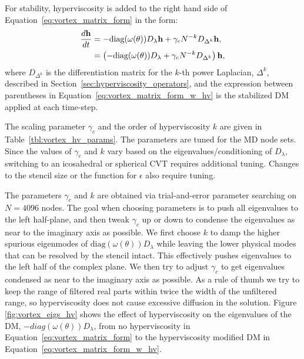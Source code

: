 \documentclass{report}
\begin{document}
For stability, hyperviscosity is added to the right hand side of Equation~\ref{eq:vortex_matrix_form} in the form: 
\begin{align}
\frac{d \mathbf{h}}{d t} & = - \text{diag}(\omega(\theta)) D_\lambda \mathbf{h} + \gamma_c N^{-k} D_{\Delta^{k}} \mathbf{h}, \nonumber \\
 & = \left(- \text{diag}(\omega(\theta)) D_\lambda + \gamma_c N^{-k} D_{\Delta^{k}}\right) \mathbf{h}, 
\label{eq:vortex_matrix_form_w_hv}
\end{align}
where $D_{\Delta^{k}}$ is the differentiation matrix for the $k$-th power Laplacian, $\Delta^{k}$, described in Section~\ref{sec:hyperviscosity_operators}, and the expression between parentheses in Equation~\ref{eq:vortex_matrix_form_w_hv} is the stabilized DM applied at each time-step. 

The scaling parameter $\gamma_c$ and the order of hyperviscosity $k$ are given in
Table~\ref{tbl:vortex_hv_params}. The parameters are tuned for the MD node sets. Since the values of $\gamma_c$ and $k$ vary based on the eigenvalues/conditioning of $D_\lambda$, switching to an icosahedral or spherical CVT requires additional tuning. Changes to the stencil size or the function for $\epsilon$ also require tuning. 

The parameters $\gamma_c$ and $k$ are obtained via trial-and-error parameter searching on $N=4096$ nodes. The goal when choosing parameters is to push all eigenvalues to the left half-plane, and then tweak $\gamma_c$ up or down to condense the eigenvalues as near to the imaginary axis as possible. We first choose $k$ to damp the higher spurious eigenmodes of $\text{diag}(\omega(\theta)) D_\lambda$ while leaving the lower physical modes that can be resolved by the stencil intact. This effectively pushes eigenvalues to the left half of the complex plane.  We then try to adjust $\gamma_c$ to get eigenvalues condensed as near to the imaginary axis as possible. As a rule of thumb we try to keep the range of filtered real parts within twice the width of the unfiltered range, so hyperviscosity does not cause excessive diffusion in the solution. Figure \ref{fig:vortex_eigs_hv} shows the effect of hyperviscosity on the eigenvalues of the DM, $-diag(\omega(\theta)) D_\lambda$, from no hyperviscosity in Equation~\ref{eq:vortex_matrix_form} to the hyperviscosity modified DM in Equation~\ref{eq:vortex_matrix_form_w_hv}. 
\end{document}
